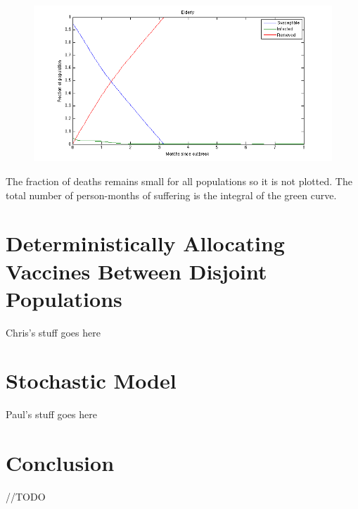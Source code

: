 \documentclass[titlepage]{article}
\begin{document}
    \begin{figure}[H]
    \centering
        \includegraphics[width=\textwidth]{figures/ryan_plot_04.png}
    \end{figure}

    The fraction of deaths remains small for all populations so it is not plotted. The total number of person-months of suffering is the integral of the green curve.

\section{Deterministically Allocating Vaccines Between Disjoint Populations}
	Chris's stuff goes here

\section{Stochastic Model}
	Paul's stuff goes here

\section{Conclusion}
	//TODO
\end{document}
